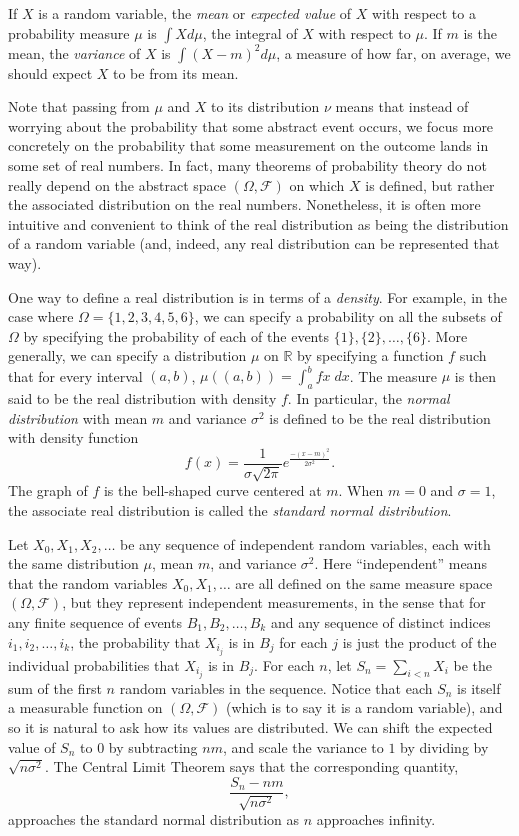 \documentclass{svjour3}
\newcommand{\RR}{\mathbb{R}}
\newcommand{\mdl}[1]{{\mathcal #1}} %
\begin{document}
If $X$ is a random variable, the \emph{mean} or \emph{expected value} of $X$ with respect to a probability measure $\mu$ is $\int X d\mu$, the integral of $X$ with respect to $\mu$. If $m$ is the mean, the \emph{variance} of $X$ is $\int (X - m)^2 d\mu$, a measure of how far, on average, we should expect $X$ to be from its mean.

Note that passing from $\mu$ and $X$ to its distribution $\nu$ means that instead of worrying about the probability that some abstract event occurs, we focus more concretely on the probability that some measurement on the outcome lands in some set of real numbers. In fact, many theorems of probability theory do not really depend on the abstract space $(\Omega, \mdl F)$ on which $X$ is defined, but rather the associated distribution on the real numbers. Nonetheless, it is often more intuitive and convenient to think of the real distribution as being the distribution of a random variable (and, indeed, any real distribution can be represented that way).

One way to define a real distribution is in terms of a \emph{density}. For example, in the case where $\Omega = \{1, 2, 3, 4, 5, 6\}$, we can specify a probability on all the subsets of $\Omega$ by specifying the probability of each of the events $\{1\}, \{2\}, \ldots, \{6\}$. More generally, we can specify a distribution $\mu$ on $\RR$ by specifying a function $f$ such that for every interval $(a, b)$, $\mu((a, b)) = \int_a^b f x \; \mathit{dx}$. The measure $\mu$ is then said to be the real distribution with density $f$. In particular, the \emph{normal distribution} with mean $m$ and variance $\sigma^2$ is defined to be the real distribution with density function
\[
f(x) = \frac{1}{\sigma \sqrt{2 \pi}} e^\frac{-(x - m)^2}{2 \sigma^2}.
\]
The graph of $f$ is the bell-shaped curve centered at $m$. When $m = 0$ and $\sigma = 1$, the associate real distribution is called the \emph{standard normal distribution}.

Let $X_0, X_1, X_2, \ldots$ be any sequence of independent random variables, each with the same distribution $\mu$, mean $m$, and variance $\sigma^2$. Here ``independent'' means that the random variables $X_0, X_1, \ldots$ are all defined on the same measure space $(\Omega, \mdl F)$, but they represent independent measurements, in the sense that for any finite sequence of events $B_1, B_2, \ldots, B_k$ and any sequence of distinct indices $i_1, i_2, \ldots, i_k$, the probability that $X_{i_j}$ is in $B_j$ for each $j$ is just the product of the individual probabilities that $X_{i_j}$ is in $B_j$. For each $n$, let $S_n = \sum_{i < n} X_i$ be the sum of the first $n$ random variables in the sequence. Notice that each $S_n$ is itself a measurable function on $(\Omega, \mdl F)$ (which is to say it is a random variable), and so it is natural to ask how its values are distributed. We can shift the expected value of $S_n$ to $0$ by subtracting $n m$, and scale the variance to $1$ by dividing by $\sqrt{ n \sigma^2}$. The Central Limit Theorem says that the corresponding quantity,
\[
 \frac{S_n - nm}{\sqrt{n \sigma^2}},
\]
approaches the standard normal distribution as $n$ approaches infinity.
\end{document}
